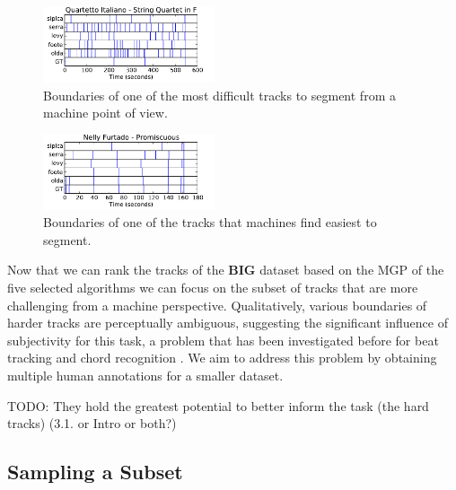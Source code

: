 \documentclass{article}
\begin{document}
\begin{figure}
  \centering
  \includegraphics[width=0.45\textwidth, height=0.13\textheight]{plots/Quartetto-machine.pdf}
  \caption{Boundaries of one of the most difficult tracks to segment from a machine point of view.}
  \label{fig:quartetto}
\end{figure}%

\begin{figure}
  \centering
  \includegraphics[width=0.45\textwidth, height=0.13\textheight]{plots/Promiscuous-machine.pdf}
  \caption{Boundaries of one of the tracks that machines find easiest to segment.}
  \label{fig:promiscuous}
\end{figure}%

Now that we can rank the tracks of the \textbf{BIG} dataset based on the MGP of the five selected algorithms we can focus on the subset of tracks that are more challenging from a machine perspective.
Qualitatively, various boundaries of harder tracks are perceptually ambiguous, suggesting the significant influence of subjectivity for this task, a problem that has been investigated before for beat tracking \cite{Grosche2010} and chord recognition \cite{Ni2013}.
We aim to address this problem by obtaining multiple human annotations for a smaller dataset.

TODO: They hold the greatest potential to better inform the task (the hard tracks) (3.1. or Intro or both?)


\subsection{Sampling a Subset}
\end{document}
